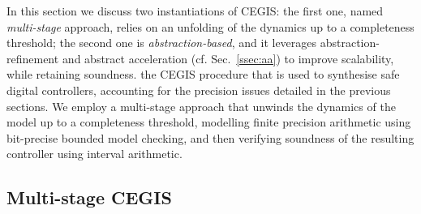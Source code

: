In this section we discuss 
\ifx\axelerator
two instantiations of CEGIS: 
the first one,
named {\it multi-stage} approach, 
relies on an unfolding of the dynamics up to a completeness threshold; 
the second one is {\it abstraction-based}, 
and it leverages abstraction-refinement \cite{DBLP:conf/cav/ClarkeGJLV00} and abstract acceleration (cf. Sec.~\ref{ssec:aa}) to improve scalability,  
while retaining soundness. 
\else
the CEGIS procedure that is used to synthesise safe digital controllers, 
accounting for the precision issues detailed in the previous sections. 
We employ a multi-stage approach that unwinds the dynamics of the model up to a completeness threshold, 
modelling finite precision arithmetic using bit-precise bounded model checking, 
and then verifying soundness of the resulting controller using interval arithmetic. 
\fi

\ifx\axelerator
\subsection{Multi-stage CEGIS} 
\label{sssec:naive}
\fi

